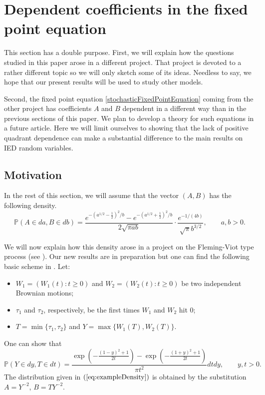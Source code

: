 \documentclass[bj]{imsart}
\numberwithin{equation}{section}
\renewcommand{\P}{\mathbb{P}}
\newcommand{\IGFT}{{\rm IED}}
\newcommand{\1}{\mathbf{1}}
\theoremstyle{definition}
\begin{document}
\section{Dependent coefficients in the fixed point equation}\label{sec:example}

\rm

This section has a double purpose. First, we will explain how the questions studied in this paper arose in a different project. 
That project  is devoted to a rather different topic so we will only sketch some of its ideas.
Needless to say, we hope that our present results will be used to study other models.

Second, the fixed point equation \eqref{stochasticFixedPointEquation} coming from the other project has coefficients $A$ and $B$ dependent in a different way than in the previous sections of this paper. We plan to develop a theory for  such equations in a future article. Here we will limit ourselves  
to showing that the lack of positive quadrant dependence can make a substantial difference to the main results on \IGFT{} random variables.

\subsection{Motivation}

In the rest of this section, we will assume that the vector $(A,B)$
has the following density.
\begin{equation}
 \P(A\in da, B\in db)=\frac{e^{-\left(a^{1/2}-\frac{1}{2}\right)^2/b}-e^{-\left(a^{1/2}+\frac{1}{2}\right)^2/b}}{2\sqrt{\pi ab}}\cdot \frac{e^{-1 /(4b)}}{\sqrt{\pi}b^{3/2}},
\qquad a,b>0.\label{eq:exampleDensity}
\end{equation}

We will now explain how this density arose in a project on the Fleming-Viot type process (see \cite{BHM}). Our new results are in preparation but one can find the following basic scheme in \cite{extinctionOfFlemingViot}. Let: 
\begin{itemize}
 \item $W_1=(W_1(t):t\geq 0)$ and $W_2=(W_2(t):t\geq 0)$ be two independent Brownian motions;
 \item $\tau_1$ and $\tau_2$, respectively, be the first times $W_1$ and $W_2$ hit $0$;
 \item  $T=\min\{\tau_1,\tau_2\}$ and $Y=\max\{W_1(T),W_2(T)\}$.  
\end{itemize}
One can show that
$$\P(Y\in dy,T\in dt)=\frac{\exp\left(-\frac{(1-y)^2+1}{2t}\right)-
\exp\left(-\frac{(1+y)^2+1}{2t}\right)}{\pi t^2}dtdy, \qquad y,t>0.$$
The distribution given in $(\ref{eq:exampleDensity})$ is obtained by the substitution
$A=Y^{-2}$, $B=TY^{-2}$.\vspace{0.2cm}
\end{document}
